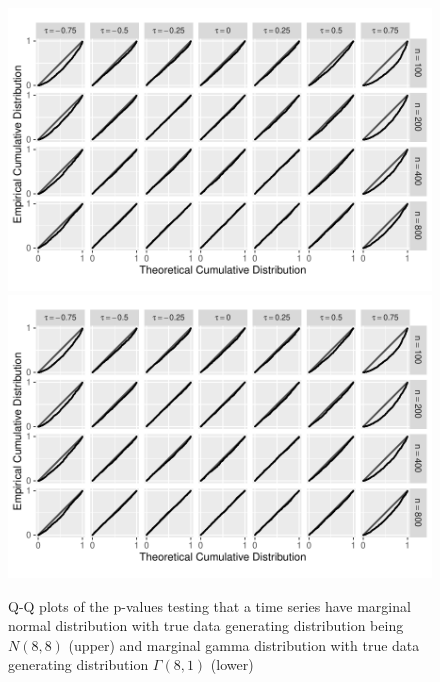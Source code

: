 \documentclass[APA,Times1COL]{WileyNJDv5} %
\begin{document}
\begin{figure}[tbp]
  \centering
  \includegraphics[width = .9\textwidth]{figures/normal}
  \includegraphics[width = .9\textwidth]{figures/gamma}
  \caption{Q-Q plots of the p-values testing that a time series
    have marginal normal distribution with true data generating distribution
    being $N(8,8)$ (upper) and marginal gamma distribution with true data
    generating distribution $\Gamma(8,1)$ (lower)}
  \label{fig:qq}
\end{figure}
\end{document}
